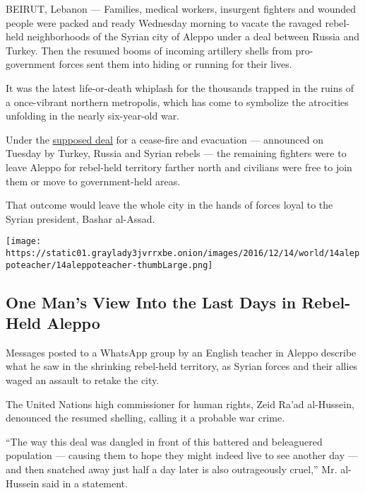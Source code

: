 BEIRUT, Lebanon --- Families, medical workers, insurgent fighters and
wounded people were packed and ready Wednesday morning to vacate the
ravaged rebel-held neighborhoods of the Syrian city of Aleppo under a
deal between Russia and Turkey. Then the resumed booms of incoming
artillery shells from pro-government forces sent them into hiding or
running for their lives.

It was the latest life-or-death whiplash for the thousands trapped in
the ruins of a once-vibrant northern metropolis, which has come to
symbolize the atrocities unfolding in the nearly six-year-old war.

Under the
\href{http://www.nytimes3xbfgragh.onion/2016/12/13/world/middleeast/syria-aleppo-civilians.html}{supposed
deal} for a cease-fire and evacuation --- announced on Tuesday by
Turkey, Russia and Syrian rebels --- the remaining fighters were to
leave Aleppo for rebel-held territory farther north and civilians were
free to join them or move to government-held areas.

That outcome would leave the whole city in the hands of forces loyal to
the Syrian president, Bashar al-Assad.

\href{https://www.nytimes3xbfgragh.onion/interactive/2016/12/14/world/middleeast/aleppo-siege-audio-video.html}{}

\texttt{[image: https://static01.graylady3jvrrxbe.onion/images/2016/12/14/world/14aleppoteacher/14aleppoteacher-thumbLarge.png]}

\hypertarget{one-mans-view-into-the-last-days-in-rebel-held-aleppo}{%
\subsection{One Man's View Into the Last Days in Rebel-Held
Aleppo}\label{one-mans-view-into-the-last-days-in-rebel-held-aleppo}}

Messages posted to a WhatsApp group by an English teacher in Aleppo
describe what he saw in the shrinking rebel-held territory, as Syrian
forces and their allies waged an assault to retake the city.

The United Nations high commissioner for human rights, Zeid Ra'ad
al-Hussein, denounced the resumed shelling, calling it a probable war
crime.

``The way this deal was dangled in front of this battered and
beleaguered population --- causing them to hope they might indeed live
to see another day --- and then snatched away just half a day later is
also outrageously cruel,'' Mr. al-Hussein said in a statement.


